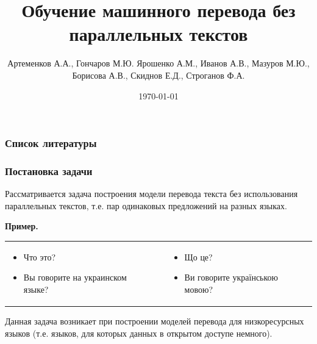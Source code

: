 \documentclass[10pt,pdf,hyperref={unicode}]{beamer}
\title{Обучение машинного перевода без параллельных текстов}
\subtitle{}
\author{Артеменков А.А., Гончаров М.Ю. Ярошенко А.М., Иванов А.В., Мазуров М.Ю., Борисова А.В., Скиднов Е.Д., Строганов Ф.А.}
\date{\today}
\begin{document}
\begin{frame}
	\begin{center}
		\begin{Large}
			
		\end{Large}
	\end{center}
\end{frame}


\begin{frame}
	\frametitle{Список литературы}
	\nocite{lample2017unsupervised} 
	\nocite{graves2005framewise}
	\nocite{kimimproving}
	\nocite{papineni2002bleu}
	
	
\end{frame}

\begin{frame}
	\frametitle{Постановка задачи}
	
	
	Рассматривается задача построения модели перевода текста без использования параллельных текстов, т.е. пар одинаковых предложений на разных языках.
	
	\textbf{Пример.}
	
	
	\begin{table}[ht]
		\centering
		\begin{tabular}{p{4cm}c| p{4cm}}
			\begin{itemize}
				\item Что это?
				
				\item Вы говорите на украинском языке? 
			\end{itemize}
			& \hfill & 
			\begin{itemize}
				
				\item Що це?
				
				\item Ви говорите українською мовою?
			\end{itemize}
		\end{tabular}
	\end{table}
	
	
	Данная задача возникает при построении моделей перевода для низкоресурсных языков (т.е. языков, для которых данных в открытом доступе немного).
	
	
\end{frame}
\end{document}
